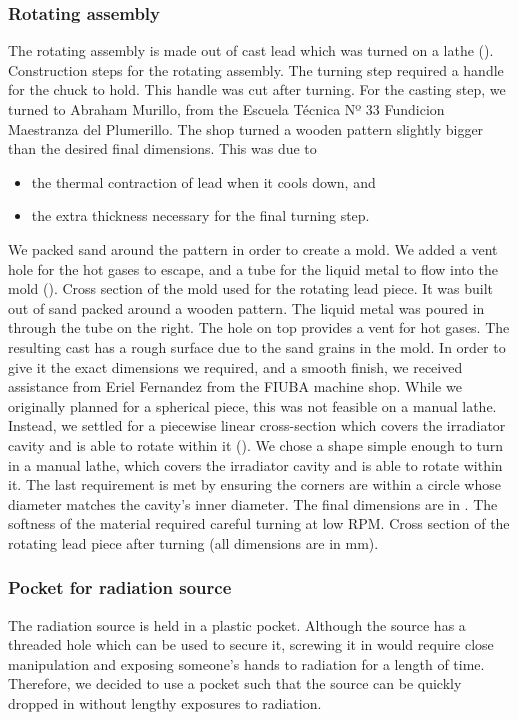\subsubsection{Rotating assembly}
The rotating assembly is made out of cast lead which was turned on a lathe
().
{Construction steps for the rotating assembly.
The turning step required a handle for the chuck to hold.
This handle was cut after turning.}
For the casting step, we turned to Abraham Murillo, from the
Escuela Técnica Nº 33 Fundicion Maestranza del Plumerillo.
The shop turned a wooden pattern slightly bigger than the desired final dimensions.
This was due to
\begin{itemize}
    \item the thermal contraction of lead when it cools down, and
    \item the extra thickness necessary for the final turning step.
\end{itemize}
We packed sand around the pattern in order to create a mold.
We added a vent hole for the hot gases to escape,
and a tube for the liquid metal to flow into the mold
().
{Cross section of the mold used for the rotating lead piece.
It was built out of sand packed around a wooden pattern.
The liquid metal was poured in through the tube on the right.
The hole on top provides a vent for hot gases.}
The resulting cast has a rough surface due to the sand grains in the mold.
In order to give it the exact dimensions we required,
and a smooth finish,
we received assistance from 
Eriel Fernandez from the FIUBA machine shop.
While we originally planned for a spherical piece,
this was not feasible on a manual lathe.
Instead, we settled for a piecewise linear cross-section
which covers the irradiator cavity
and is able to rotate within it
().
{We chose a shape simple enough to turn in a manual lathe,
which covers the irradiator cavity and is able to rotate within it.
The last requirement is met by ensuring the corners are within a circle
whose diameter matches the cavity's inner diameter.}
The final dimensions are in .
The softness of the material required careful turning at low RPM.
{Cross section of the rotating lead piece after turning (all dimensions are in mm).}
\subsubsection{Pocket for radiation source}
The radiation source is held in a plastic pocket.
Although the source has a threaded hole which can be used to secure it,
screwing it in would require close manipulation
and exposing someone's hands to radiation for a length of time.
Therefore, we decided to use a pocket such that the source
can be quickly dropped in without lengthy exposures to radiation.

